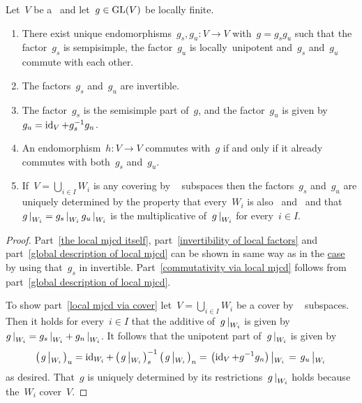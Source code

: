 \begin{proposition}
  \label{local mjcd}
  Let~$V$ be a~ and let~$g \in \operatorname{GL}(V)$ be locally finite.
  \begin{enumerate}
    \item
      \label{the local mjcd itself}
      There exist unique endomorphisms~$g_s, g_u \colon V \to V$ with~$g = g_s g_u$ such that the factor~$g_s$ is sempisimple, the factor~$g_u$ is locally~unipotent and~$g_s$ and~$g_u$ commute with each other.
    \item
      \label{invertibility of local factors}
      The factors~$g_s$ and~$g_u$ are invertible.
    \item
      \label{global description of local mjcd}
      The factor~$g_s$ is the semisimple part of~$g$, and the factor~$g_u$ is given by~$g_u = \operatorname{id}_V + g_s^{-1} g_n$.
    \item
      \label{commutativity via local mjcd}
      An endomorphism~$h \colon V \to V$ commutes with~$g$ if and only if it already commutes with both~$g_s$ and~$g_u$.
    \item
      \label{local mjcd via cover}
      If~$V = \bigcup_{i \in I} W_i$ is any covering by ~ subspaces then the factors~$g_s$ and~$g_u$ are uniquely determined by the property that every~$W_i$ is also~ and~ and that~$\restrict{g}{W_i} = \restrict{g_s}{W_i} \, \restrict{g_u}{W_i}$ is the multiplicative {\JCD} of~$\restrict{g}{W_i}$ for every~$i \in I$.
  \end{enumerate}
\end{proposition}


\begin{proof}
  Part~\ref*{the local mjcd itself}, part~\ref*{invertibility of local factors} and part~\ref*{global description of local mjcd} can be shown in same way as in the \hyperref[mjcd]{ case} by using that~$g_s$ in invertible.
  Part~\ref*{commutativity via local mjcd} follows from part~\ref*{global description of local mjcd}.
  
  To show part~\ref*{local mjcd via cover} let~$V = \bigcup_{i \in I} W_i$ be a cover by ~ subspaces.
  Then it holds for every~$i \in I$ that the additive {\JCD} of~$\restrict{g}{W_i}$ is given by~$\restrict{g}{W_i} = \restrict{g_s}{W_i} + \restrict{g_n}{W_i}$.
  It follows that the unipotent part of~$\restrict{g}{W_i}$ is given by
  \[
      \left( \restrict*{g}{W_i} \right)_u
    =   \id_{W_i}
      + \left( \restrict*{g}{W_i} \right)_s^{-1}
        \left( \restrict*{g}{W_i} \right)_n
    = \restrict*{ \left( \id_V + g^{-1} g_n \right) }{W_i}
    = \restrict*{ g_u }{W_i}
  \]
  as desired.
  That~$g$ is uniquely determined by its restrictions~$\restrict{g}{W_i}$ holds because the~$W_i$ cover~$V$.
\end{proof}


